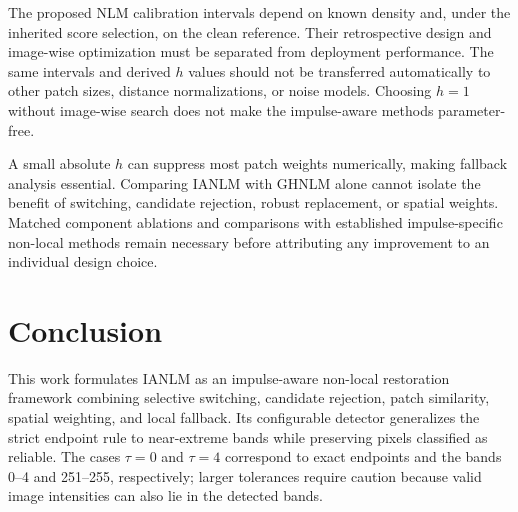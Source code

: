 \documentclass[pdflatex,iicol,sn-mathphys-num]{sn-jnl}
\newif\ifshowportuguese
\newcommand{\pt}[1]{\ifshowportuguese\par\begingroup\small\color{blue!55!black}\noindent\textbf{PT: }#1\par\endgroup\fi}
\begin{document}
The proposed NLM calibration intervals depend on known density and, under the inherited score selection, on the clean reference. Their retrospective design and image-wise optimization must be separated from deployment performance. The same intervals and derived $h$ values should not be transferred automatically to other patch sizes, distance normalizations, or noise models. Choosing $h=1$ without image-wise search does not make the impulse-aware methods parameter-free.
\pt{Os intervalos propostos para calibração do NLM dependem da densidade conhecida e, sob a seleção herdada por score, da referência limpa. Sua definição retrospectiva e otimização por imagem devem ser separadas do desempenho na aplicação. Os mesmos intervalos e valores derivados de $h$ não devem ser transferidos automaticamente para outros tamanhos de patch, normalizações de distância ou modelos de ruído. Escolher $h=1$ sem busca por imagem não torna os métodos orientados a impulsos livres de parâmetros.}

A small absolute $h$ can suppress most patch weights numerically, making fallback analysis essential. Comparing IANLM with GHNLM alone cannot isolate the benefit of switching, candidate rejection, robust replacement, or spatial weights. Matched component ablations and comparisons with established impulse-specific non-local methods remain necessary before attributing any improvement to an individual design choice.
\pt{Um $h$ absoluto pequeno pode suprimir numericamente a maioria dos pesos entre patches, tornando essencial a análise de fallback. Comparar apenas IANLM com GHNLM não isola o benefício do chaveamento, da rejeição de candidatos, da substituição robusta ou dos pesos espaciais. Ablações correspondentes de componentes e comparações com métodos não locais estabelecidos específicos para impulsos continuam necessárias antes de atribuir qualquer melhoria a uma escolha individual de projeto.}

\section{Conclusion}
\label{sec:conclusion}

This work formulates IANLM as an impulse-aware non-local restoration framework combining selective switching, candidate rejection, patch similarity, spatial weighting, and local fallback. Its configurable detector generalizes the strict endpoint rule to near-extreme bands while preserving pixels classified as reliable. The cases $\tau=0$ and $\tau=4$ correspond to exact endpoints and the bands 0--4 and 251--255, respectively; larger tolerances require caution because valid image intensities can also lie in the detected bands.
\pt{Este trabalho formula o IANLM como uma estrutura de restauração não local orientada a impulsos que combina chaveamento seletivo, rejeição de candidatos, similaridade entre patches, ponderação espacial e fallback local. Seu detector configurável generaliza a regra estrita dos extremos para faixas próximas deles, preservando pixels classificados como confiáveis. Os casos $\tau=0$ e $\tau=4$ correspondem aos extremos exatos e às faixas 0--4 e 251--255, respectivamente; tolerâncias maiores exigem cautela porque intensidades válidas da imagem também podem estar nas faixas detectadas.}
\end{document}
